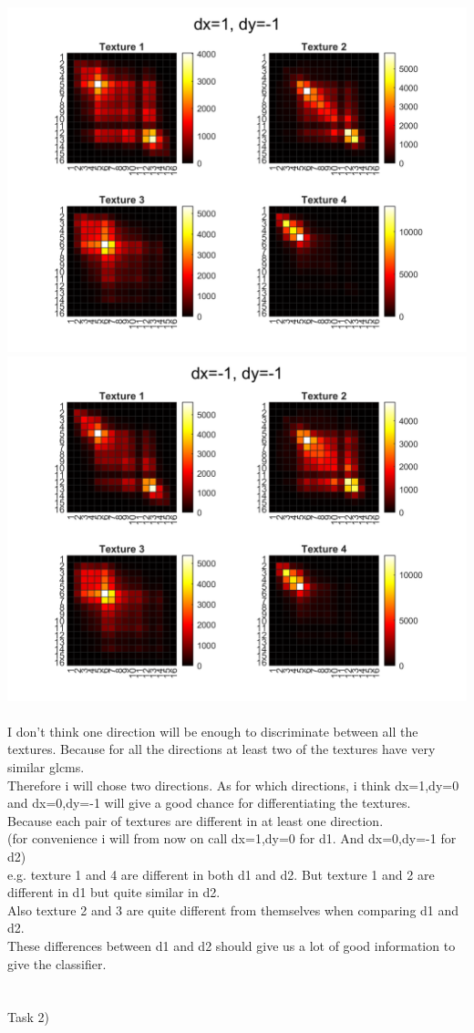 \documentclass[12pt, letterpaper, twoside]{article}
\begin{document}
\includegraphics[scale=0.4]{"task1_d3"}\\
\includegraphics[scale=0.4]{"task1_d4"}\\
\ \\
I don't think one direction will be enough to discriminate between all the textures. Because for all the directions at least two of the textures have very similar glcms.\\
Therefore i will chose two directions. As for which directions, i think dx=1,dy=0 and dx=0,dy=-1 will give a good chance for differentiating the textures.\\
Because each pair of textures are different in at least one direction.\\
(for convenience i will from now on call dx=1,dy=0 for d1. And dx=0,dy=-1 for d2)\\
e.g. texture 1 and 4 are different in both d1 and d2. But texture 1 and 2 are different in d1 but quite similar in d2.\\
Also texture 2 and 3 are quite different from themselves when comparing d1 and d2.\\
These differences between d1 and d2 should give us a lot of good information to give the classifier.\\
\ \\
\ \\
Task 2)\\
\ \\
\end{document}

